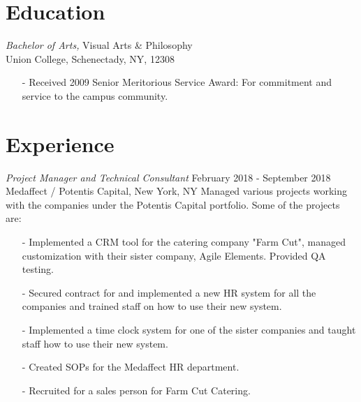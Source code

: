 \documentclass{res} %
\begin{document}
\begin{resume}


\vspace{-10pt}
\section{Education} \vspace{15pt}
{\sl Bachelor of Arts,} Visual Arts \& Philosophy \\
Union College, Schenectady, NY, 12308 \\
\vspace{-10pt}
\begin{itemize}
\item[-] Received 2009 Senior Meritorious Service Award: For commitment and service to the campus community.
\end{itemize}
 
\section{Experience} \vspace{15pt}
{\sl Project Manager and Technical Consultant} \hfill February 2018 - September 2018\\
Medaffect / Potentis Capital, New York, NY \vspace{5pt}
\newline
Managed various projects working with the companies under the Potentis Capital portfolio. Some of the projects are:
\vspace{5pt}
\begin{itemize}
\item[-] Implemented a CRM tool for the catering company "Farm Cut", managed customization with their sister company, Agile Elements. Provided QA testing. 
\item[-] Secured contract for and implemented a new HR system for all the companies and trained staff on how to use their new system.
\item[-] Implemented a time clock system for one of the sister companies and taught staff how to use their new system.
\item[-] Created SOPs for the Medaffect HR department.
\item[-] Recruited for a sales person for Farm Cut Catering.
\end{itemize}


\end{resume}
\end{document}
